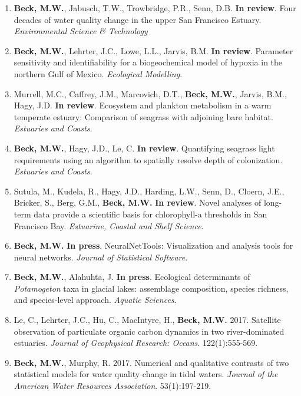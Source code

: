 \documentclass[letterpaper,12pt]{article}
\begin{document}
\begin{enumerate}

\item \textbf{Beck, M.W.}, Jabusch, T.W., Trowbridge, P.R., Senn, D.B. {\bf In review}. Four decades of water quality change in the upper San Francisco Estuary. \textit{Environmental Science \& Technology}

\item \textbf{Beck, M.W.}, Lehrter, J.C., Lowe, L.L., Jarvis, B.M. {\bf In review}. Parameter sensitivity and identifiability for a biogeochemical model of hypoxia in the northern Gulf of Mexico. \textit{Ecological Modelling}.

\item Murrell, M.C., Caffrey, J.M., Marcovich, D.T., \textbf{Beck, M.W.}, Jarvis, B.M., Hagy, J.D. {\bf In review}. Ecosystem and plankton metabolism in a warm temperate estuary: Comparison of seagrass with adjoining bare habitat. \textit{Estuaries and Coasts}.

\item \textbf{Beck, M.W.}, Hagy, J.D., Le, C. {\bf In review}. Quantifying seagrass light requirements using an algorithm to spatially resolve depth of colonization. \textit{Estuaries and Coasts}. 

\item Sutula, M., Kudela, R., Hagy, J.D., Harding, L.W., Senn, D., Cloern, J.E., Bricker, S., Berg, G.M., \textbf{Beck, M.W.} {\bf In review}. Novel analyses of long-term data provide a scientific basis for chlorophyll-a thresholds in San Francisco Bay. \textit{Estuarine, Coastal and Shelf Science}.

\item \textbf{Beck, M.W.} {\bf In press}. NeuralNetTools: Visualization and analysis tools for neural networks. \textit{Journal of Statistical Software}.

\item \textbf{Beck, M.W.}, Alahuhta, J. {\bf In press}. Ecological determinants of \textit{Potamogeton} taxa in glacial lakes: assemblage composition, species richness, and species-level approach. \textit{Aquatic Sciences}.

\item Le, C., Lehrter, J.C., Hu, C., MacIntyre, H., \textbf{Beck, M.W.} 2017. Satellite observation of particulate organic carbon dynamics in two river-dominated estuaries. \textit{Journal of Geophysical Research: Oceans}. 122(1):555-569.

\item \textbf{Beck, M.W.}, Murphy, R. 2017. Numerical and qualitative contrasts of two statistical models for water quality change in tidal waters. \textit{Journal of the American Water Resources Association}. 53(1):197-219.


\end{enumerate}
\end{document}
